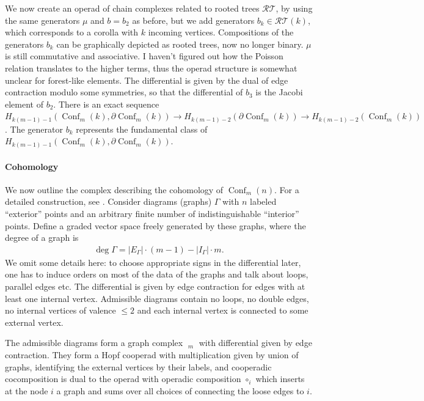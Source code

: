 \documentclass{scrartcl}
\theoremstyle{plain}
\theoremstyle{definition}
\newcommand{\abs}[1]{\left\lvert#1\right\rvert}
\DeclareMathOperator{\Conf}{Conf}
\DeclareMathOperator{\coGraphs}{{}^*Graphs}
\newcommand{\comp}{\mathbin{\circ}}
\begin{document}
We now create an operad of chain complexes related to rooted trees $\mathcal{RT}$, by using the same generators $\mu$ and $b=b_2$ as before, but we add generators $b_k\in\mathcal{RT}(k)$, which corresponds to a corolla with $k$ incoming vertices. Compositions of the generators $b_k$ can be graphically depicted as rooted trees, now no longer binary. $\mu$ is still commutative and associative. I haven't figured out how the Poisson relation translates to the higher terms, thus the operad structure is somewhat unclear for forest-like elements. The differential is given by the dual of edge contraction modulo some symmetries, so that the differential of $b_3$ is the Jacobi element of $b_2$. There is an exact sequence $H_{k(m-1)-1}(\Conf_m(k), \partial\Conf_m(k)) \to H_{k(m-1)-2}(\partial\Conf_m(k)) \to H_{k(m-1)-2}(\Conf_m(k))$. The generator $b_k$ represents the fundamental class of $H_{k(m-1)-1}(\Conf_m(k), \partial\Conf_m(k))$.

\paragraph{Cohomology} We now outline the complex describing the cohomology of $\Conf_m(n)$. For a detailed construction, see \cite[Chapter 6]{lambrechts2014formality}. Consider diagrams (graphs) $\Gamma$ with $n$ labeled ``exterior'' points and an arbitrary finite number of indistinguishable ``interior'' points. Define a graded vector space freely generated by these graphs, where the degree of a graph is 
\begin{align*}
    \deg \Gamma = \abs{E_\Gamma} \cdot (m-1) - \abs{I_\Gamma} \cdot m.
\end{align*} 
We omit some details here: to choose appropriate signs in the differential later, one has to induce orders on most of the data of the graphs and talk about loops, parallel edges etc. The differential is given by edge contraction for edges with at least one internal vertex. Admissible diagrams contain no loops, no double edges, no internal vertices of valence $\leq 2$ and each internal vertex is connected to some external vertex. 

The admissible diagrams form a graph complex $\coGraphs_m$ with differential given by edge contraction. They form a Hopf cooperad with multiplication given by union of graphs, identifying the external vertices by their labels, and cooperadic cocomposition is dual to the operad with operadic composition $\comp_i$ which inserts at the node $i$ a graph and sums over all choices of connecting the loose edges to $i$. 
\end{document}

